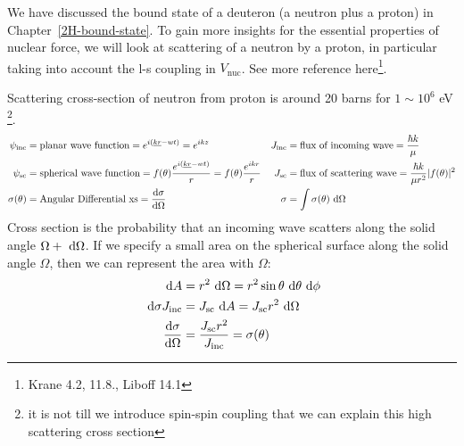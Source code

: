 \documentclass{school-22.101-notes}
\date{October 24, 2011}
\begin{document}
\maketitle

We have discussed the bound state of a deuteron (a neutron plus a proton) in Chapter~\ref{2H-bound-state}. To gain more insights for the essential properties of nuclear force, we will look at scattering of a neutron by a proton, in particular taking into account the l-s coupling in $V_{\mathrm{nuc}}$. See more reference here\footnote{Krane 4.2, 11.8., Liboff 14.1}.

Scattering cross-section of neutron from proton is around 20 barns for $1 \sim 10^6$ eV \footnote{it is not till we introduce spin-spin coupling that we can explain this high scattering cross section}. 
\begin{align}
\psi_{\mathrm{inc}} &= \mbox{planar wave function} = e^{i (\underline{k} \underline{r} - wt)} = e^{ikz} &J_{\mathrm{inc}} &= \mbox{flux of incoming wave} = \frac{\hbar k}{\mu} \\
\psi_{\mathrm{sc}} &= \mbox{spherical wave function} =  f(\theta) \frac{e^{i (\underline{k} \underline{r} - wt)}}{r} = f(\theta) \frac{e^{ikr}}{r} &J_{\mathrm{sc}} &= \mbox{flux of scattering wave} = \frac{\hbar k}{\mu r^2} |f(\theta)|^2 \\
\sigma(\theta) &= \mbox{Angular Differential xs} = \frac{\mathrm{d}\sigma}{\mathrm{d}\Omega}  &\sigma &= \int \sigma(\theta) \mbox{ }\mathrm{d} \Omega
\end{align}
Cross section is the probability that an incoming wave scatters along the solid angle $\Omega+\mbox{ }\mathrm{d} \Omega$. If we specify a small area on the spherical surface along the solid angle $\Omega$, then we can represent the area with $\Omega$:
\begin{align}
\mbox{ }\mathrm{d} A &= r^2 \mbox{ }\mathrm{d} \Omega = r^2 \sin \theta \mbox{ }\mathrm{d} \theta \mbox{ }\mathrm{d} \phi \\
\mbox{ }\mathrm{d} \sigma J_{\mathrm{inc}} &= J_{\mathrm{sc}} \mbox{ }\mathrm{d} A = J_{\mathrm{sc}} r^2 \mbox{ }\mathrm{d} \Omega \\
\frac{\mathrm{d}\sigma}{\mathrm{d}\Omega} &= \frac{J_{\mathrm{sc}} r^2}{J_{\mathrm{inc}}} = \sigma(\theta) 
\end{align}
\end{document}
